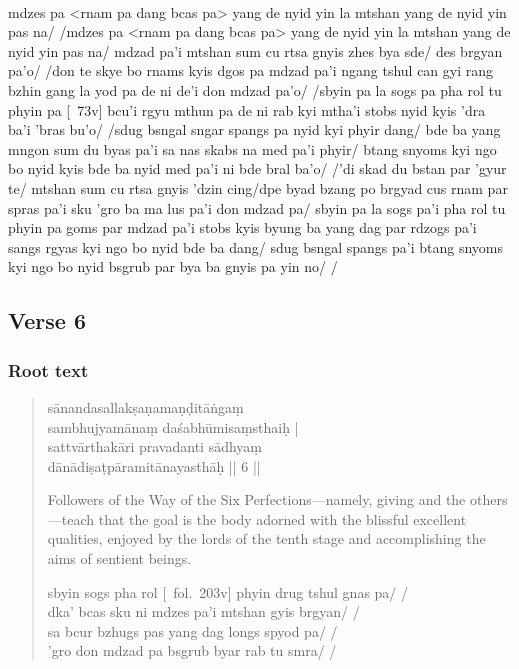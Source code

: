 \documentclass[12pt]{article}
\begin{document}
\textbf{\TVB}\\
mdzes pa <rnam pa dang bcas pa> yang de nyid yin la mtshan yang de nyid yin pas na/ /mdzes pa <rnam pa dang bcas pa> yang de nyid yin la mtshan yang de nyid yin pas na/ mdzad pa'i mtshan sum cu rtsa gnyis zhes bya sde/ des brgyan pa'o/ /don te skye bo rnams kyis dgos pa mdzad pa'i ngang tshul can gyi rang bzhin gang la yod pa de ni de'i don mdzad pa'o/ /sbyin pa la sogs pa pha rol tu phyin pa [\TVB\ 73v] bcu'i rgyu mthun pa de ni rab kyi mtha'i stobs nyid kyis 'dra ba'i 'bras bu'o/ /sdug bsngal sngar spangs pa nyid kyi phyir dang/ bde ba yang mngon sum du byas pa'i sa nas skabs na med pa'i phyir/ btang snyoms kyi ngo bo nyid kyis bde ba nyid med pa'i ni bde bral ba'o/ /'di skad du bstan par 'gyur te/ mtshan sum cu rtsa gnyis 'dzin cing/dpe byad bzang po brgyad cus rnam par spras pa'i sku 'gro ba ma lus pa'i don mdzad pa/ sbyin pa la sogs pa'i pha rol tu phyin pa goms par mdzad pa'i stobs kyis byung ba yang dag par rdzogs pa'i sangs rgyas kyi ngo bo nyid bde ba dang/ sdug bsngal spangs pa'i btang snyoms kyi ngo bo nyid bsgrub par bya ba gnyis pa yin no/ /

\subsection{Verse 6}
\subsubsection{Root text}
\begin{quote}
	sānandasallakṣaṇamaṇḍitāṅgaṃ \\
	sambhujyamānaṃ daśabhūmisaṃsthaiḥ |\\
	sattvārthakāri pravadanti sādhyaṃ \\
	dānādiṣaṭpāramitānayasthāḥ || 6 ||

	Followers of the Way of the Six Perfections—namely, giving and the others—teach that the goal is the body adorned with the blissful excellent qualities, enjoyed by the lords of the tenth stage and accomplishing the aims of sentient beings.

	sbyin sogs pha rol [\TM\ fol.\ 203v] phyin drug tshul gnas pa/ /\\
	dka' bcas sku ni mdzes pa'i mtshan gyis brgyan/ /\\
	sa bcur bzhugs pas yang dag longs spyod pa/ /\\
	'gro don mdzad pa bsgrub byar rab tu smra/ /
\end{quote}
\end{document}
